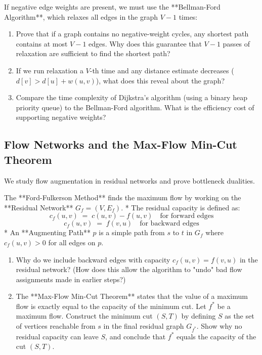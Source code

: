 \documentclass[12pt, a4paper]{book}
\begin{document}
\begin{explobox}
If negative edge weights are present, we must use the **Bellman-Ford Algorithm**, which relaxes all edges in the graph $V-1$ times:
\begin{enumerate}[label=(\alph*), leftmargin=*]
  \item Prove that if a graph contains no negative-weight cycles, any shortest path contains at most $V-1$ edges.
        Why does this guarantee that $V-1$ passes of relaxation are sufficient to find the shortest path?
  \item If we run relaxation a $V$-th time and any distance estimate decreases ($d[v] > d[u] + w(u, v)$), what does this reveal about the graph?
  \item Compare the time complexity of Dijkstra's algorithm (using a binary heap priority queue) to the Bellman-Ford algorithm. What is the efficiency cost of supporting negative weights?
\end{enumerate}
\end{explobox}

\subsection{Flow Networks and the Max-Flow Min-Cut Theorem}

We study flow augmentation in residual networks and prove bottleneck dualities.

\begin{explobox}
The **Ford-Fulkerson Method** finds the maximum flow by working on the **Residual Network** $G_f = (V, E_f)$.
* The residual capacity is defined as:
  \[
    c_f(u, v) \;=\; c(u, v) - f(u, v) \quad \text{for forward edges}
  \]
  \[
    c_f(u, v) \;=\; f(v, u) \quad \text{for backward edges}
  \]
* An **Augmenting Path** $p$ is a simple path from $s$ to $t$ in $G_f$ where $c_f(u, v) > 0$ for all edges on $p$.
\begin{enumerate}[label=(\alph*), leftmargin=*]
  \item Why do we include backward edges with capacity $c_f(u, v) = f(v, u)$ in the residual network? (How does this allow the algorithm to "undo" bad flow assignments made in earlier steps?)
  \item The **Max-Flow Min-Cut Theorem** states that the value of a maximum flow is exactly equal to the capacity of the minimum cut.
        Let $f^*$ be a maximum flow.
        Construct the minimum cut $(S, T)$ by defining $S$ as the set of vertices reachable from $s$ in the final residual graph $G_{f^*}$.
        Show why no residual capacity can leave $S$, and conclude that $f^*$ equals the capacity of the cut $(S, T)$.
\end{enumerate}
\end{explobox}
\end{document}
